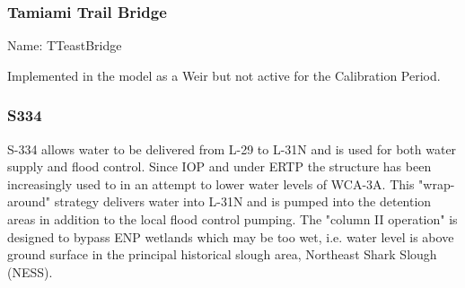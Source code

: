 %

\clearpage
\subsubsection{Tamiami Trail Bridge}
Name: TTeastBridge

Implemented in the model as a Weir but not active for the Calibration Period.


\clearpage
\subsubsection{S334}
S-334 allows water to be delivered from L-29 to L-31N and is used for both water supply and flood control.
Since IOP and under ERTP the structure has been increasingly used to in an attempt to lower water levels of WCA-3A.
This "wrap-around" strategy delivers water into L-31N and is pumped into the detention areas in addition to the local flood control pumping.
The "column II operation" is designed to bypass ENP wetlands which may be too wet, i.e. water level is above ground surface in the principal historical slough area, Northeast Shark Slough (NESS).


